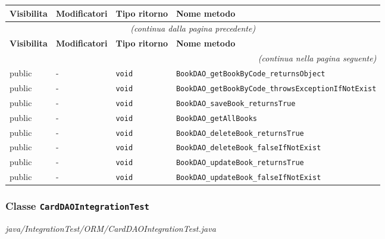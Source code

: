 \begin{longtable}{@{}llll@{}}
\toprule
\textbf{Visibilita} & \textbf{Modificatori} & \textbf{Tipo ritorno} & \textbf{Nome metodo} \\
\midrule
\endfirsthead
\multicolumn{4}{c}{\small\itshape (continua dalla pagina precedente)} \\
\toprule
\textbf{Visibilita} & \textbf{Modificatori} & \textbf{Tipo ritorno} & \textbf{Nome metodo} \\
\midrule
\endhead
\midrule
\multicolumn{4}{r}{\small\itshape (continua nella pagina seguente)} \\
\endfoot
\bottomrule
\endlastfoot
  public & - & \texttt{void} & \texttt{BookDAO\_getBookByCode\_returnsObject} \\
  public & - & \texttt{void} & \texttt{BookDAO\_getBookByCode\_throwsExceptionIfNotExist} \\
  public & - & \texttt{void} & \texttt{BookDAO\_saveBook\_returnsTrue} \\
  public & - & \texttt{void} & \texttt{BookDAO\_getAllBooks} \\
  public & - & \texttt{void} & \texttt{BookDAO\_deleteBook\_returnsTrue} \\
  public & - & \texttt{void} & \texttt{BookDAO\_deleteBook\_falseIfNotExist} \\
  public & - & \texttt{void} & \texttt{BookDAO\_updateBook\_returnsTrue} \\
  public & - & \texttt{void} & \texttt{BookDAO\_updateBook\_falseIfNotExist} \\
\end{longtable}

\subsubsection*{Classe \texttt{CardDAOIntegrationTest}}\label{CardDAOIntegrationTest}
{\small\textit{java/IntegrationTest/ORM/CardDAOIntegrationTest.java}}
\vspace{4pt}

